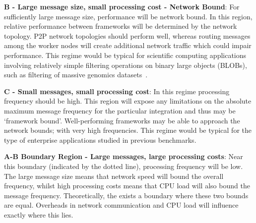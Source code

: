 \documentclass[letterpaper,conference]{IEEEtran}
\begin{document}
\textbf{B - Large message size, small processing cost - Network Bound}: For sufficiently large message size, performance will be network bound. In this region, relative performance between frameworks will be determined by the network topology. P2P network topologies should perform well, whereas routing messages among the worker nodes will create additional network traffic which could impair performance. This regime would be typical for scientific computing applications involving relatively simple filtering operations on binary large objects (BLOBs), such as filtering of massive genomics datasets~\cite{ausmeesBAMSIMulticloudService2018}.


\textbf{C - Small messages, small processing cost}: In this regime processing frequency should be high. This region will expose any limitations on the absolute maximum message frequency for the particular integration and thus may be `framework bound'. Well-performing frameworks may be able to approach the network bounds; with very high frequencies. This regime would be typical for the type of enterprise applications studied in previous benchmarks.%

\textbf{A-B Boundary Region - Large messages, large processing costs}: Near this boundary (indicated by the dotted line), processing frequency will be low. The large message size means that network speed will bound the overall frequency, whilst high processing costs means that CPU load will also bound the message frequency. Theoretically, the exists a boundary where these two bounds are equal. Overheads in network communication and CPU load will influence exactly where this lies. 




\end{document}
